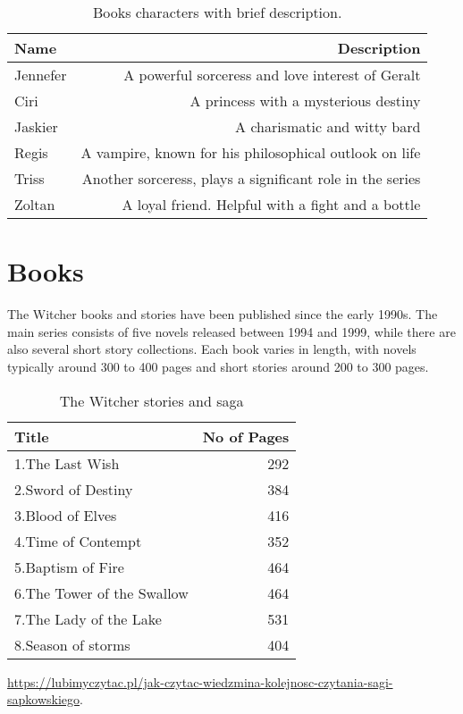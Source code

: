 \documentclass{article}
\begin{document}
\begin{table}
\centering
\begin{tabular}{l|r}
Name & Description \\\hline
Jennefer & A powerful sorceress and love interest of Geralt \\
Ciri & A princess with a mysterious destiny \\
Jaskier & A charismatic and witty bard \\
Regis & A vampire, known for his philosophical outlook on life \\
Triss & Another sorceress, plays a significant role in the series \\
Zoltan & A loyal friend. Helpful with a fight and a bottle \\
\end{tabular}
\caption{\label{tab:widgets}Books characters with brief description.}
\end{table}

\section{Books}

The Witcher books and stories have been published since the early 1990s. The main series consists of five novels released between 1994 and 1999, while there are also several short story collections. Each book varies in length, with novels typically around 300 to 400 pages and short stories around 200 to 300 pages.

\begin{table}
\centering
\begin{tabular}{l|r}
Title & No of Pages \\\hline
1.The Last Wish & 292 \\
2.Sword of Destiny & 384 \\
3.Blood of Elves & 416 \\
4.Time of Contempt & 352  \\
5.Baptism of Fire & 464 \\
6.The Tower of the Swallow & 464 \\
7.The Lady of the Lake & 531 \\
8.Season of storms & 404 \\

\end{tabular}
\caption{\label{tab:widgets}The Witcher stories and saga}
\end{table}

\newpage


\url{https://lubimyczytac.pl/jak-czytac-wiedzmina-kolejnosc-czytania-sagi-sapkowskiego}.
\end{document}

